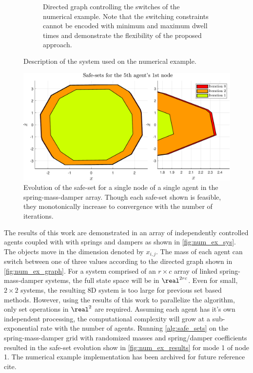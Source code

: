 \begin{figure}
\begin{subfigure}[t]{0.45\columnwidth}
		\caption{Directed graph controlling the switches of the numerical example. Note that the switching constraints cannot be encoded with minimum and maximum dwell times and demonstrate the flexibility of the proposed approach.}
		\label{fig:num_ex_graph}
	\end{subfigure}
	\caption{Description of the system used on the numerical example.}
\end{figure}

\begin{figure}[t]
\centering
\includegraphics[width=\columnwidth]{./figures/num_ex_results}
\caption{Evolution of the safe-set for a single node of a single agent in the spring-mass-damper array. Though each safe-set shown is feasible, they monotonically increase to convergence with the number of iterations.}
\label{fig:num_ex_results}
\end{figure}

The results of this work are demonstrated in an array of independently controlled agents coupled with with springs and dampers as shown in \autoref{fig:num_ex_sys}. The objects move in the dimension denoted by $x_{i,j}$. The mass of each agent can switch between one of three values according to the directed graph shown in \autoref{fig:num_ex_graph}. For a system comprised of an $r\times c$ array of linked spring-mass-damper systems, the full state space will be in $\real^{2rc}$. Even for small, $2\times 2$ systems, the resulting 8D system is too large for previous set based methods. However, using the results of this work to parallelize the algorithm, only set operations in $\real^2$ are required. Assuming each agent has it's own independent processing, the computational complexity will grow at a sub-exponential rate with the number of agents. Running \autoref{alg:safe_sets} on the spring-mass-damper grid with randomized masses and spring/damper coefficients resulted in the safe-set evolution show in \autoref{fig:num_ex_results} for mode 1 of node 1. The numerical example implementation has been archived for future reference \alert{cite}. 